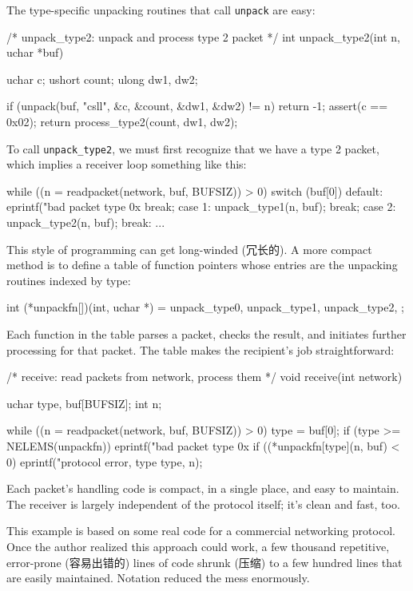The type-specific unpacking routines that call \verb'unpack' are easy:
\begin{wellcode}
    /* unpack_type2: unpack and process type 2 packet */
    int unpack_type2(int n, uchar *buf)
    {
        uchar   c;
        ushort  count;
        ulong   dw1, dw2;

        if (unpack(buf, "csll", &c, &count, &dw1, &dw2) != n)
            return -1;
        assert(c == 0x02);
        return process_type2(count, dw1, dw2);
    }
\end{wellcode}
To call \verb'unpack_type2', we must first recognize that we have a type 2
packet, which implies a receiver loop something like this:
\begin{wellcode}
    while ((n = readpacket(network, buf, BUFSIZ)) > 0) {
        switch (buf[0]) {
        default:
            eprintf("bad packet type 0x%
            break;
        case 1:
            unpack_type1(n, buf);
            break;
        case 2:
            unpack_type2(n, buf);
            break:
        ...
        }
    }
\end{wellcode}
This style of programming can get long-winded (冗长的). A more compact
method is to define a table of function pointers whose entries are the
unpacking routines indexed by type:
\begin{wellcode}
    int (*unpackfn[])(int, uchar *) = {
        unpack_type0,
        unpack_type1,
        unpack_type2,
    };
\end{wellcode}
Each function in the table parses a packet, checks the result, and
initiates further processing for that packet. The table makes the
recipient's job straightforward:
\begin{wellcode}
    /* receive: read packets from network, process them */
    void receive(int network)
    {
        uchar   type, buf[BUFSIZ];
        int     n;

        while ((n = readpacket(network, buf, BUFSIZ)) > 0) {
            type = buf[0];
            if (type >= NELEMS(unpackfn))
                eprintf("bad packet type 0x%
            if ((*unpackfn[type](n, buf) < 0)
                eprintf("protocol error, type %
                        type, n);
        }
    }
\end{wellcode}
Each packet's handling code is compact, in a single place, and easy to
maintain. The receiver is largely independent of the protocol itself; it's
clean and fast, too.

This example is based on some real code for a commercial networking
protocol.  Once the author realized this approach could work, a few
thousand repetitive, error-prone (容易出错的) lines of code shrunk (压缩)
to a few hundred lines that are easily maintained. Notation reduced the
mess enormously.

